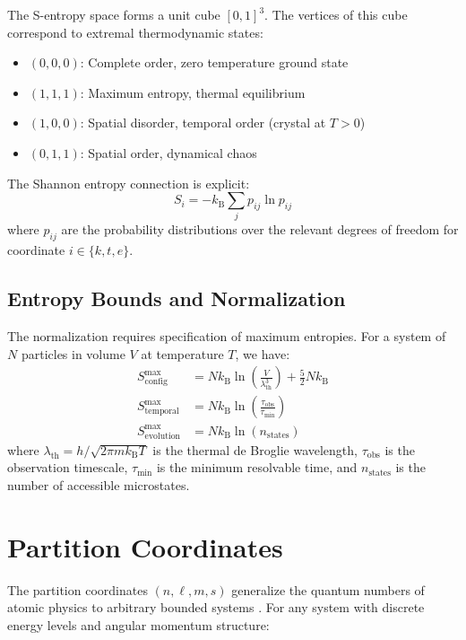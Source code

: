 \documentclass[twocolumn,aps,prd,superscriptaddress,nofootinbib]{revtex4-2}
\newcommand{\kB}{k_{\mathrm{B}}}
\begin{document}
The S-entropy space forms a unit cube $[0,1]^3$. The vertices of this cube correspond to extremal thermodynamic states:
\begin{itemize}
    \item $(0,0,0)$: Complete order, zero temperature ground state
    \item $(1,1,1)$: Maximum entropy, thermal equilibrium
    \item $(1,0,0)$: Spatial disorder, temporal order (crystal at $T>0$)
    \item $(0,1,1)$: Spatial order, dynamical chaos
\end{itemize}

The Shannon entropy connection \cite{shannon1948mathematical, cover2006elements} is explicit:
\begin{equation}
S_i = -\kB \sum_j p_{ij} \ln p_{ij}
\end{equation}
where $p_{ij}$ are the probability distributions over the relevant degrees of freedom for coordinate $i \in \{k, t, e\}$.

\subsection{Entropy Bounds and Normalization}

The normalization requires specification of maximum entropies. For a system of $N$ particles in volume $V$ at temperature $T$, we have:
\begin{align}
S_{\text{config}}^{\max} &= N\kB \ln\left(\frac{V}{\lambda_{\text{th}}^3}\right) + \frac{5}{2}N\kB \\
S_{\text{temporal}}^{\max} &= N\kB \ln\left(\frac{\tau_{\text{obs}}}{\tau_{\text{min}}}\right) \\
S_{\text{evolution}}^{\max} &= N\kB \ln(n_{\text{states}})
\end{align}
where $\lambda_{\text{th}} = h/\sqrt{2\pi m \kB T}$ is the thermal de Broglie wavelength, $\tau_{\text{obs}}$ is the observation timescale, $\tau_{\text{min}}$ is the minimum resolvable time, and $n_{\text{states}}$ is the number of accessible microstates.

\section{Partition Coordinates}
\label{sec:partition}

The partition coordinates $(n, \ell, m, s)$ generalize the quantum numbers of atomic physics to arbitrary bounded systems \cite{griffiths2018introduction}. For any system with discrete energy levels and angular momentum structure:
\end{document}
